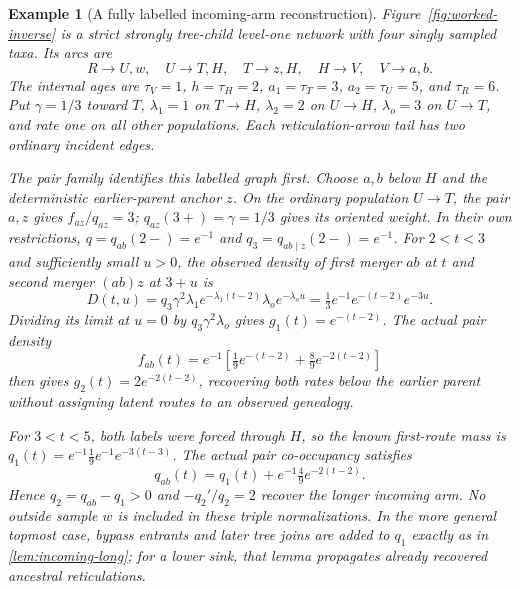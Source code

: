\documentclass[11pt]{article}
\newtheorem{example}[theorem]{Example}
\begin{document}
\begin{example}[A fully labelled incoming-arm reconstruction]
\label{ex:worked-inverse}
Figure~\ref{fig:worked-inverse} is a strict strongly tree-child level-one
network with four singly sampled taxa. Its arcs are
\[
 R\to U,w,\quad U\to T,H,\quad T\to z,H,\quad
 H\to V,\quad V\to a,b.
\]
The internal ages are $\tau_V=1$, $h=\tau_H=2$, $a_1=\tau_T=3$,
$a_2=\tau_U=5$, and $\tau_R=6$. Put $\gamma=1/3$ toward $T$,
$\lambda_1=1$ on $T\to H$, $\lambda_2=2$ on $U\to H$,
$\lambda_o=3$ on $U\to T$, and rate one on all other populations.
Each reticulation-arrow tail has two ordinary incident edges.

The pair family identifies this labelled graph first. Choose $a,b$ below
$H$ and the deterministic earlier-parent anchor $z$. On the ordinary
population $U\to T$, the pair $a,z$ gives $f_{az}/q_{az}=3$;
$q_{az}(3+)=\gamma=1/3$ gives its oriented weight. In their own restrictions,
$q=q_{ab}(2-)=e^{-1}$ and $q_3=q_{ab\mid z}(2-)=e^{-1}$.
For $2<t<3$ and sufficiently small $u>0$, the observed density of first
merger $ab$ at $t$ and second merger $(ab)z$ at $3+u$ is
\[
 D(t,u)=q_3\gamma^2\lambda_1 e^{-\lambda_1(t-2)}
              \lambda_o e^{-\lambda_o u}
        =\tfrac13 e^{-1}e^{-(t-2)}e^{-3u}.
\]
Dividing its limit at $u=0$ by $q_3\gamma^2\lambda_o$ gives
$g_1(t)=e^{-(t-2)}$. The actual pair density
\[
 f_{ab}(t)=e^{-1}\left[\tfrac19 e^{-(t-2)}
                      +\tfrac89 e^{-2(t-2)}\right]
\]
then gives $g_2(t)=2e^{-2(t-2)}$, recovering both rates below the earlier
parent without assigning latent routes to an observed genealogy.

For $3<t<5$, both labels were forced through $H$, so the known first-route
mass is $q_1(t)=e^{-1}\tfrac19 e^{-1}e^{-3(t-3)}$. The actual pair
co-occupancy satisfies
\[
 q_{ab}(t)=q_1(t)+e^{-1}\tfrac49 e^{-2(t-2)}.
\]
Hence $q_2=q_{ab}-q_1>0$ and $-q_2'/q_2=2$ recover the longer incoming arm.
No outside sample $w$ is included in these triple normalizations. In the
more general topmost case, bypass entrants and later tree joins are added
to $q_1$ exactly as in \cref{lem:incoming-long}; for a lower sink, that
lemma propagates already recovered ancestral reticulations.
\end{example}
\end{document}
